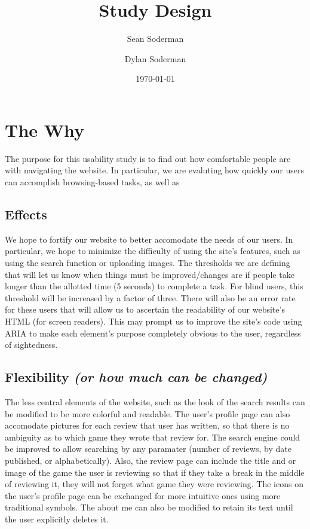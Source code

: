 \documentclass[11pt]{extarticle}
\begin{document}
\title{Study Design}
\author{Sean Soderman\\ 
        \and
        Dylan Soderman
}
\date{\today}
\maketitle

\section*{The Why} %
The purpose for this usability study is to find out how comfortable people are with navigating the website. In 
particular, we are evaluting how quickly our users can accomplish browsing-based tasks, as well as 
\subsection*{Effects}
We hope to fortify our website to better accomodate the needs of our users. In particular, we hope to minimize the
difficulty of using the site's features, such as using the search function or uploading images. The thresholds
we are defining that will let us know when things must be improved/changes are if people take longer than the
allotted time (5 seconds) to complete a task. For blind users, this threshold will be increased by a factor of
three. There will also be an error rate for these users that will allow us to ascertain the readability of our
website's HTML (for screen readers). This may prompt us to improve the site's code using ARIA to make each element's
purpose completely obvious to the user, regardless of sightedness.
\subsection*{Flexibility \textit{(or how much can be changed)}}
The less central elements of the website, such as the look of the search results can be modified to be more colorful
and readable. The user's profile page can also accomodate pictures for each review that user has written, so that
there is no ambiguity as to which game they wrote that review for. The search engine could be improved to allow
searching by any paramater (number of reviews, by date published, or alphabetically). Also, the review page can
include the title and or image of the game the user is reviewing so that if they take a break in the middle of
reviewing it, they will not forget what game they were reviewing. The icons on the user's profile page can
be exchanged for more intuitive ones using more traditional symbols. The about me can also be modified to
retain its text until the user explicitly deletes it.
\end{document}
